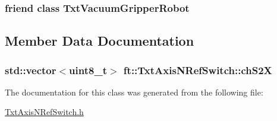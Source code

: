 \subsubsection[{\texorpdfstring{Txt\+Vacuum\+Gripper\+Robot}{TxtVacuumGripperRobot}}]{\setlength{\rightskip}{0pt plus 5cm}friend class {\bf Txt\+Vacuum\+Gripper\+Robot}\hspace{0.3cm}{\ttfamily [friend]}}\hypertarget{classft_1_1_txt_axis_n_ref_switch_aea03938f89578033a66fa5dba1f9fe09}{}\label{classft_1_1_txt_axis_n_ref_switch_aea03938f89578033a66fa5dba1f9fe09}


\subsection{Member Data Documentation}
\subsubsection[{\texorpdfstring{ch\+S2X}{chS2X}}]{\setlength{\rightskip}{0pt plus 5cm}std\+::vector$<$uint8\+\_\+t$>$ ft\+::\+Txt\+Axis\+N\+Ref\+Switch\+::ch\+S2X\hspace{0.3cm}{\ttfamily [protected]}}\hypertarget{classft_1_1_txt_axis_n_ref_switch_a36c2c99525ecda394e43472cb9bfd4a7}{}\label{classft_1_1_txt_axis_n_ref_switch_a36c2c99525ecda394e43472cb9bfd4a7}


The documentation for this class was generated from the following file\+:\begin{DoxyCompactItemize}
\item 
\hyperlink{_txt_axis_n_ref_switch_8h}{Txt\+Axis\+N\+Ref\+Switch.\+h}\end{DoxyCompactItemize}
